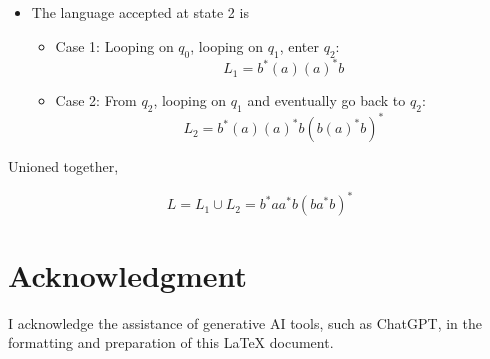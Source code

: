\documentclass[12pt]{article}
\begin{document}
\section{}
\begin{center}
\end{center}
\begin{itemize}
    \item The language accepted at state 2 is 
    \begin{itemize}
        \item Case 1: Looping on \(q_0\), looping on \(q_1\), enter \(q_2\):
            \[L_1 = b^*(a)(a)^*b\]
        \item Case 2: From \(q_2\), looping on \(q_1\) and eventually go back to \(q_2\):
            \[L_2 = b^*(a)(a)^*b(b(a)^*b)^*\]
    \end{itemize}
    
\end{itemize}
Unioned together, 
    \begin{center}
        \[L = L_1 \cup L_2 = b^*aa^*b(ba^*b)^*\]
    \end{center}

    \section*{Acknowledgment}
    I acknowledge the assistance of generative AI tools, such as ChatGPT, in the formatting and preparation of this LaTeX document.
    
\end{document}

